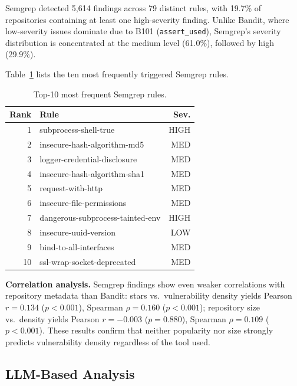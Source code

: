 \documentclass[sigconf,authordraft]{acmart}
\begin{document}
Semgrep detected 5{,}614 findings across 79 distinct rules, with
19.7\% of repositories containing at least one high-severity finding.
Unlike Bandit, where low-severity issues dominate due to B101
(\texttt{assert\_used}), Semgrep's severity distribution is
concentrated at the medium level (61.0\%), followed by high (29.9\%).

Table~\ref{tab:top-rules-semgrep} lists the ten most frequently
triggered Semgrep rules.

\begin{table}[h]
  \caption{Top-10 most frequent Semgrep rules.}
  \label{tab:top-rules-semgrep}
  \begin{tabular}{rlr}
    \toprule
    Rank & Rule & Sev. \\
    \midrule
    1  & subprocess-shell-true              & HIGH \\
    2  & insecure-hash-algorithm-md5        & MED \\
    3  & logger-credential-disclosure       & MED \\
    4  & insecure-hash-algorithm-sha1       & MED \\
    5  & request-with-http                  & MED \\
    6  & insecure-file-permissions          & MED \\
    7  & dangerous-subprocess-tainted-env   & HIGH \\
    8  & insecure-uuid-version              & LOW \\
    9  & bind-to-all-interfaces             & MED \\
    10 & ssl-wrap-socket-deprecated         & MED \\
    \bottomrule
  \end{tabular}
\end{table}

\textbf{Correlation analysis.}
Semgrep findings show even weaker correlations with repository
metadata than Bandit: stars vs.\ vulnerability density yields
Pearson $r = 0.134$ ($p < 0.001$), Spearman $\rho = 0.160$
($p < 0.001$); repository size vs.\ density yields Pearson
$r = -0.003$ ($p = 0.880$), Spearman $\rho = 0.109$ ($p < 0.001$).
These results confirm that neither popularity nor size strongly
predicts vulnerability density regardless of the tool used.

\subsection{LLM-Based Analysis}
\end{document}
